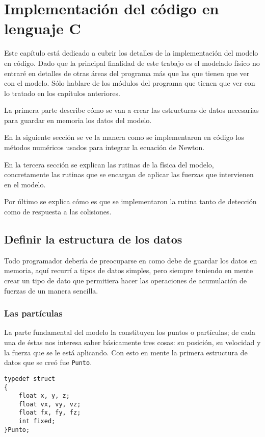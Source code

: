\chapter{Implementación del código en lenguaje C}
Este capítulo está dedicado a cubrir los detalles de la implementación del modelo en código. Dado que la principal finalidad de este trabajo es el modelado físico no entraré en detalles de otras áreas del programa más que las que tienen que ver con el modelo. Sólo hablare de los módulos del programa que tienen que ver con lo tratado en los capítulos anteriores.

La primera parte describe cómo se van a crear las estructuras de datos necesarias para guardar en memoria los datos del modelo.

En la siguiente sección se ve la manera como se implementaron en código los métodos numéricos usados para integrar la ecuación de Newton.

En la tercera sección se explican las rutinas de la física del modelo, concretamente las rutinas que se encargan de aplicar las fuerzas que intervienen en el modelo.

Por último se explica cómo es que se implementaron la rutina tanto de detección como de respuesta a las colisiones.

\section{Definir la estructura de los datos}
Todo programador debería de preocuparse en como debe de guardar los datos en memoria, aquí recurrí a tipos de datos simples, pero siempre teniendo en mente crear un tipo de dato que permitiera hacer las operaciones de acumulación de fuerzas de un manera sencilla.

\subsection{Las partículas}
La parte fundamental del modelo la constituyen los puntos o partículas; de cada una de éstas nos interesa saber básicamente tres cosas: su posición, su velocidad y la fuerza que se le está aplicando. Con esto en mente la primera estructura de datos que se creó fue \verb|Punto|.

\begin{verbatim}
typedef struct
{
    float x, y, z;
    float vx, vy, vz;
    float fx, fy, fz;
    int fixed;
}Punto;
\end{verbatim}


